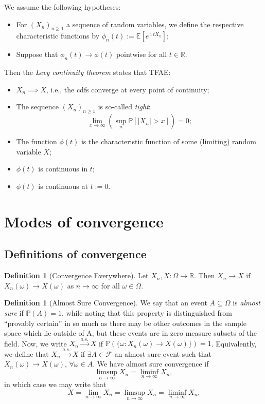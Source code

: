 \documentclass[12pt,reqno]{article}
\renewcommand{\emph}[1]{\textit{#1}}
\theoremstyle{plain}
\theoremstyle{definition}
\newtheorem{definition}[theorem]{Definition}
\newcommand{\PP}[1]{\ensuremath{\mathbb{P}\left(#1\right)}}
\begin{document}
We assume the following hypotheses: 
\begin{itemize} 

\item For $(X_n)_{n \geq 1}$ a sequence of random variables, we define the respective 
characteristic functions by $\phi_n(t) := \mathbb{E}[e^{\imath tX_n}]$; 
\item Suppose that $\phi_n(t) \rightarrow \phi(t)$ pointwise for all $t \in \mathbb{R}$. 

\end{itemize} 
Then the \emph{Levy continuity theorem} states that TFAE: 
\begin{itemize} 

\item $X_n \implies X$, i.e., the cdfs converge at every point of continuity; 
\item The sequence $(X_n)_{n \geq 1}$ is so-called \emph{tight}: 
     \[
     \lim_{x \rightarrow \infty} \left(\sup_n \mathbb{P}[|X_n| > x]\right) = 0; 
     \]
\item The function $\phi(t)$ is the characteristic function of some (limiting) random variable $X$; 
\item $\phi(t)$ is continuous in $t$; 
\item $\phi(t)$ is continuous at $t := 0$. 

\end{itemize} 

\newpage 
\section{Modes of convergence} 

\subsection{Definitions of convergence} 

\begin{definition}[Convergence Everywhere]
Let $X_n,X: \Omega \rightarrow \mathbb{R}$. Then 
$X_n \rightarrow X$ if $X_n(\omega) \rightarrow X(\omega)$ as 
$n \rightarrow \infty$ for all $\omega \in \Omega$. 
\end{definition} 

\begin{definition}[Almost Sure Convergence] 
We say that an event $A \subseteq \Omega$ is \emph{almost sure} if 
$\PP{A} = 1$, while noting that this property is distinguished from 
``provably certain'' in so much as there may be other outcomes in the 
sample space which lie outside of A, but these events are in zero 
measure subsets of the field. Now, 
we write $X_n \xrightarrow{a.s.} X$ if 
$\mathbb{P}(\{\omega: X_n(\omega) \rightarrow X(\omega)\}) = 1$. 
Equivalently, we define that $X_n \xrightarrow{a.s.} X$ if 
$\exists A \in \mathcal{F}$ an almost sure event such that 
$X_n(\omega) \rightarrow X(\omega)$, $\forall \omega \in A$. 
We have almost sure convergence if
\[
\limsup_{n \rightarrow \infty} X_n = \liminf_{n \rightarrow \infty} X_n, 
\]
in which case we may write that 
\[
X = \lim_{n \rightarrow \infty} X_n = 
     \limsup_{n \rightarrow \infty} X_n = \liminf_{n \rightarrow \infty} X_n. 
\]
\end{definition}
\end{document}
